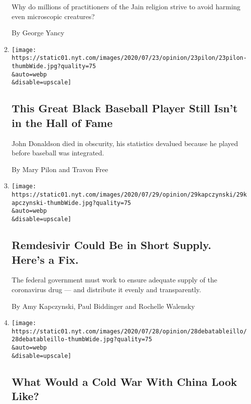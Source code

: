 \begin{enumerate}
  Why do millions of practitioners of the Jain religion strive to avoid
  harming even microscopic creatures?

  By George Yancy
\item
  \href{/2020/07/29/opinion/john-donaldson-baseball-black-players.html}{}

  \texttt{[image: https://static01.nyt.com/images/2020/07/23/opinion/23pilon/23pilon-thumbWide.jpg?quality=75\\\&auto=webp\\\&disable=upscale]}

  \hypertarget{this-great-black-baseball-player-still-isnt-in-the-hall-of-fame-1}{%
  \subsection{This Great Black Baseball Player Still Isn't in the Hall
  of
  Fame}\label{this-great-black-baseball-player-still-isnt-in-the-hall-of-fame-1}}

  John Donaldson died in obscurity, his statistics devalued because he
  played before baseball was integrated.

  By Mary Pilon and Travon Free
\item
  \href{/2020/07/28/opinion/remdesivir-shortage-coronavirus.html}{}

  \texttt{[image: https://static01.nyt.com/images/2020/07/29/opinion/29kapczynski/29kapczynski-thumbWide.jpg?quality=75\\\&auto=webp\\\&disable=upscale]}

  \hypertarget{remdesivir-could-be-in-short-supply-heres-a-fix}{%
  \subsection{Remdesivir Could Be in Short Supply. Here's a
  Fix.}\label{remdesivir-could-be-in-short-supply-heres-a-fix}}

  The federal government must work to ensure adequate supply of the
  coronavirus drug --- and distribute it evenly and transparently.

  By Amy Kapczynski, Paul Biddinger and Rochelle Walensky
\item
  \href{/2020/07/28/opinion/trump-china.html}{}

  \texttt{[image: https://static01.nyt.com/images/2020/07/28/opinion/28debatableillo/28debatableillo-thumbWide.jpg?quality=75\\\&auto=webp\\\&disable=upscale]}

  \hypertarget{what-would-a-cold-war-with-china-look-like}{%
  \subsection{What Would a Cold War With China Look
  Like?}\label{what-would-a-cold-war-with-china-look-like}}


\end{enumerate}
